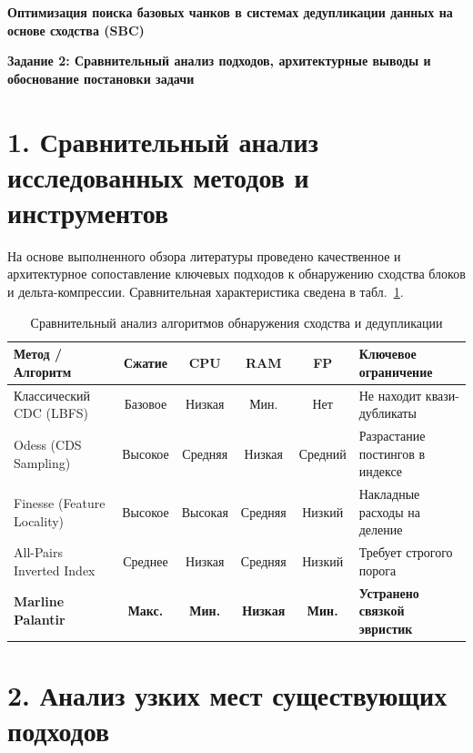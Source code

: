 \documentclass[a4paper,14pt]{extarticle}
\begin{document}
\begin{center}
    \textbf{\Large Оптимизация поиска базовых чанков в системах дедупликации данных на основе сходства (SBC)}
    
    \vspace{0.5em}
    \textbf{\large Задание 2: Сравнительный анализ подходов, архитектурные выводы и обоснование постановки задачи}
\end{center}

\vspace{1em}

\section*{1. Сравнительный анализ исследованных методов и инструментов}

На основе выполненного обзора литературы проведено качественное и архитектурное сопоставление ключевых подходов к обнаружению сходства блоков и дельта-компрессии. Сравнительная характеристика сведена в табл.~\ref{tab:comparison_analysis}.

\begin{table}[h!]
\small
\centering
\caption{Сравнительный анализ алгоритмов обнаружения сходства и дедупликации}
\label{tab:comparison_analysis}
\begin{tabularx}{\textwidth}{p{3.8cm}ccccX}
\toprule
\textbf{Метод / Алгоритм} & \textbf{Сжатие} & \textbf{CPU} & \textbf{RAM} & \textbf{FP} & \textbf{Ключевое ограничение} \\
\midrule
Классический CDC (LBFS) & Базовое & Низкая & Мин. & Нет & Не находит квази-дубликаты \\
Odess (CDS Sampling) & Высокое & Средняя & Низкая & Средний & Разрастание постингов в индексе \\
Finesse (Feature Locality) & Высокое & Высокая & Средняя & Низкий & Накладные расходы на деление \\
All-Pairs Inverted Index & Среднее & Низкая & Средняя & Низкий & Требует строгого порога \\
\textbf{Marline Palantir} & \textbf{Макс.} & \textbf{Мин.} & \textbf{Низкая} & \textbf{Мин.} & \textbf{Устранено связкой эвристик} \\
\bottomrule
\end{tabularx}
\end{table}

\section*{2. Анализ узких мест существующих подходов}
\end{document}
